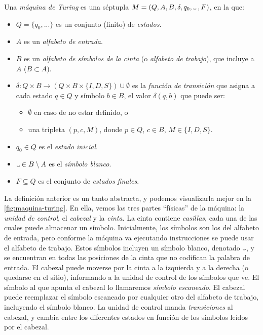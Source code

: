 \begin{definicion}\label{def:maquina-turing}
Una \emph{máquina de Turing} es una séptupla \linebreak $M=(Q, A, B, \delta, q_0, \Vtextvisiblespace\:, F)$, en la que:

\begin{itemize}
    \item $Q = \{q_0, ...\}$ es un conjunto (finito) de \textit{estados}.
    \item $A$ es un \textit{alfabeto de entrada}.
    \item $B$ es un \textit{alfabeto de símbolos de la cinta} (o \emph{alfabeto de trabajo}), que incluye a $A$ ($B\subset A$).
    \item $\delta : Q \times B \longrightarrow (Q \times B \times \{I, D, S\}) \cup \emptyset$ es la \textit{función de transición} que asigna a cada estado $q\in Q$ y símbolo $b\in B$, el valor $\delta(q, b)$ que puede ser:
    \begin{itemize}
        \item $\emptyset$ en caso de no estar definido, o
        \item una tripleta $(p, c, M)$, donde $p\in Q$, $c\in B$, $M \in \{I, D, S\}$.
    \end{itemize}
    \item $q_0\in Q$ es el \textit{estado inicial}.
    \item $\Vtextvisiblespace\in B \setminus A$ es el \textit{símbolo blanco}.
    \item $F \subseteq Q$ es el conjunto de \textit{estados finales}.
\end{itemize}
\end{definicion}

La definición anterior es un tanto abstracta, y podemos visualizarla mejor en la \cref{fig:maquina-turing}. En ella, vemos las tres partes ``físicas'' de la máquina: la \emph{unidad de control}, el \emph{cabezal} y la \emph{cinta}. La cinta contiene \emph{casillas}, cada una de las cuales puede almacenar un símbolo. Inicialmente, los símbolos son los del alfabeto de entrada, pero conforme la máquina va ejecutando instrucciones se puede usar el alfabeto de trabajo. Estos símbolos incluyen un símbolo blanco, denotado $\Vtextvisiblespace$, y se encuentran en todas las posiciones de la cinta que no codifican la palabra de entrada. El cabezal puede moverse por la cinta a la izquierda y a la derecha (o quedarse en el sitio), informando a la unidad de control de los símbolos que ve. El símbolo al que apunta el cabezal lo llamaremos \emph{símbolo escaneado}. El cabezal puede reemplazar el símbolo escaneado por cualquier otro del alfabeto de trabajo, incluyendo el símbolo blanco. La unidad de control manda \emph{transiciones} al cabezal, y cambia entre los diferentes estados en función de los símbolos leídos por el cabezal.

